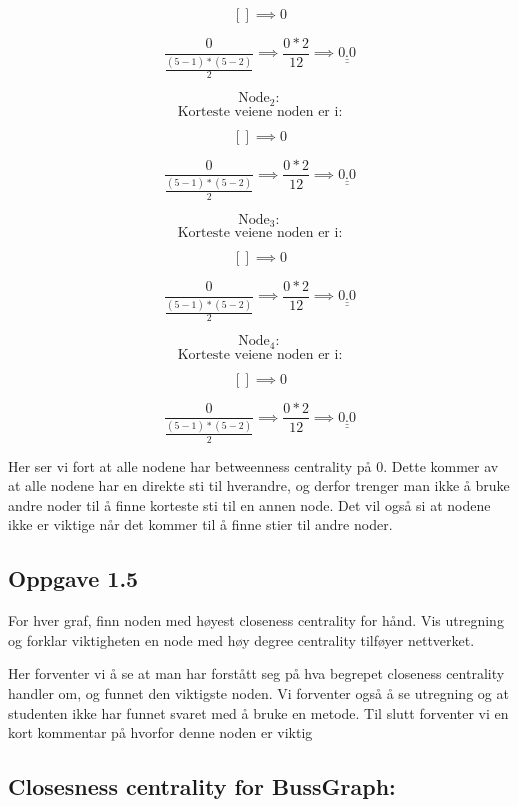 \documentclass[11pt]{article}
\begin{document}
\[ [] \implies 0 \]

\[ \frac{0}{\frac{(5-1)*(5-2)}{2}} \implies \frac{0*2}{12} \implies \underline{\underline{ 0.0 }}\]

\[\text{Node}_2:\] \[\text{Korteste veiene noden er i:}\]

\[ [] \implies 0 \]

\[ \frac{0}{\frac{(5-1)*(5-2)}{2}} \implies \frac{0*2}{12} \implies \underline{\underline{ 0.0 }}\]

\[\text{Node}_3:\] \[\text{Korteste veiene noden er i:}\]

\[ [] \implies 0 \]

\[ \frac{0}{\frac{(5-1)*(5-2)}{2}} \implies \frac{0*2}{12} \implies \underline{\underline{ 0.0 }}\]

\[\text{Node}_4:\] \[\text{Korteste veiene noden er i:}\]

\[ [] \implies 0 \]

\[ \frac{0}{\frac{(5-1)*(5-2)}{2}} \implies \frac{0*2}{12} \implies \underline{\underline{ 0.0 }}\]

Her ser vi fort at alle nodene har betweenness centrality på 0. Dette
kommer av at alle nodene har en direkte sti til hverandre, og derfor
trenger man ikke å bruke andre noder til å finne korteste sti til en
annen node. Det vil også si at nodene ikke er viktige når det kommer til
å finne stier til andre noder.

    \hypertarget{oppgave-1.5}{%
\subsection*{Oppgave 1.5}\label{oppgave-1.5}}

For hver graf, finn noden med høyest closeness centrality for hånd. Vis
utregning og forklar viktigheten en node med høy degree centrality
tilføyer nettverket.

Her forventer vi å se at man har forstått seg på hva begrepet closeness
centrality handler om, og funnet den viktigste noden. Vi forventer også
å se utregning og at studenten ikke har funnet svaret med å bruke en
metode. Til slutt forventer vi en kort kommentar på hvorfor denne noden
er viktig

    \hypertarget{closesness-centrality-for-bussgraph}{%
\subsection*{Closesness centrality for
BussGraph:}\label{closesness-centrality-for-bussgraph}}
\end{document}
